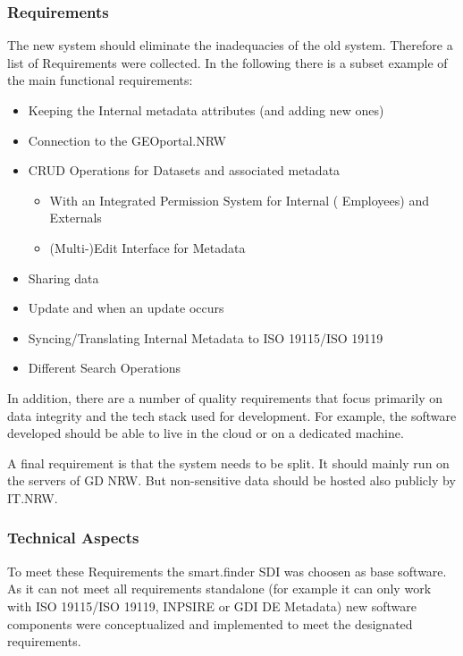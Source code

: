 \documentclass[11pt, titlepage, a4paper]{article}
\begin{document}
\subsubsection{Requirements}
The new system should eliminate the inadequacies of the old system. Therefore a list of Requirements were collected. In the following there is a subset example of the main functional requirements:
\begin{itemize}
    \item Keeping the Internal metadata attributes (and adding new ones)
    \item Connection to the GEOportal.NRW
    \item CRUD Operations for Datasets and associated metadata
          \begin{itemize}
              \item With an Integrated Permission System for Internal ( Employees) and Externals
              \item (Multi-)Edit Interface for Metadata
          \end{itemize}
    \item Sharing data
    \item Update  and  when an update occurs
    \item Syncing/Translating Internal Metadata to ISO 19115/ISO 19119
    \item Different Search Operations
\end{itemize}




In addition, there are a number of quality requirements that focus primarily on data integrity and the tech stack used for development. For example, the software developed should be able to live in the cloud or on a dedicated machine.

A final requirement is that the system needs to be split. It should mainly run on the servers of  GD NRW. But  non-sensitive data should be hosted also publicly by IT.NRW. 

\subsubsection{Technical Aspects}
To meet these Requirements the smart.finder SDI was choosen as base software. As it can not meet all requirements standalone (for example it can only work with ISO 19115/ISO 19119, INPSIRE or GDI DE Metadata) new software components were conceptualized and implemented to meet the designated requirements.
\end{document}
